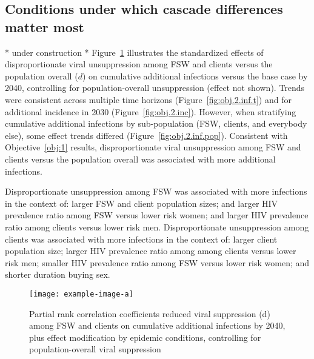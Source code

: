 \subsection{Conditions under which cascade differences matter most}\label{res.obj.2}
* under construction * \begingroup\color{lightgray}
Figure~\ref{fig:obj.2.inf} illustrates the standardized effects of
disproportionate viral unsuppression among FSW and clients versus the population overall ($d$)
on cumulative additional infections versus the base case by 2040,
controlling for population-overall unsuppression (effect not shown).
Trends were consistent across multiple time horizons (Figure~\ref{fig:obj.2.inf.t})
and for additional incidence in 2030 (Figure~\ref{fig:obj.2.inc}).
However, when stratifying cumulative additional infections by sub-population
(FSW, clients, and everybody else),
some effect trends differed (Figure~\ref{fig:obj.2.inf.pop}).
Consistent with Objective~\ref{obj:1} results,
disproportionate viral unsuppression among FSW and clients versus the population overall
was associated with more additional infections.
\par
Disproportionate unsuppression among FSW was associated with more infections in the context of:
larger FSW and client population sizes; and
larger HIV prevalence ratio among FSW versus lower risk women; and
larger HIV prevalence ratio among clients versus lower risk men.
Disproportionate unsuppression among clients was associated with more infections in the context of:
larger client population size;
larger HIV prevalence ratio among among clients versus lower risk men;
smaller HIV prevalence ratio among FSW versus lower risk women; and
shorter duration buying sex.
\endgroup
\begin{figure}
  \begingroup\color{lightgray}
  \texttt{[image: example-image-a]}%
  \caption{Partial rank correlation coefficients reduced viral suppression (d) among FSW and clients
    on cumulative additional infections by 2040,
    plus effect modification by epidemic conditions,
    controlling for population-overall viral suppression}
  \label{fig:obj.2.inf}
  \endgroup
\end{figure}
\par